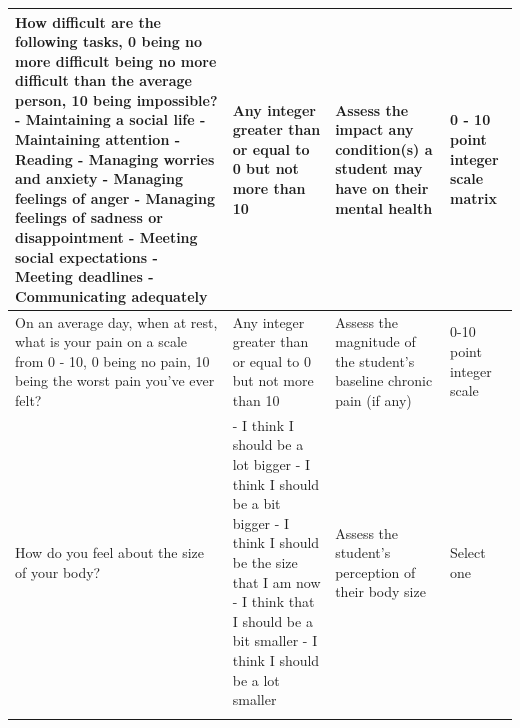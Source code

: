 \documentclass[10pt, twocolumn]{article}
\begin{document}
\begin{xltabular}{\textwidth}{|p{0.3\textwidth}|p{0.3\textwidth}|p{0.2\textwidth}|X|}
    How difficult are the following tasks, 0 being no more difficult being no more difficult than the average person, 10 being impossible? \newline - Maintaining a social life \newline - Maintaining attention \newline - Reading \newline - Managing worries and anxiety \newline - Managing feelings of anger \newline - Managing feelings of sadness or disappointment \newline - Meeting social expectations \newline - Meeting deadlines \newline - Communicating adequately & Any integer greater than or equal to 0 but not more than 10  & Assess the impact any condition(s) a student may have on their mental health & 0 - 10 point integer scale matrix \\ \hline 
    On an average day, when at rest, what is your pain on a scale from 0 - 10, 0 being no pain, 10 being the worst pain you've ever felt? & Any integer greater than or equal to 0 but not more than 10  & Assess the magnitude of the student's baseline chronic pain (if any) & 0-10 point integer scale \\ \hline 
    How do you feel about the size of your body? & - I think I should be a lot bigger \newline - I think I should be a bit bigger \newline - I think I should be the size that I am now \newline - I think that I should be a bit smaller \newline - I think I should be a lot smaller & Assess the student's perception of their body size & Select one \\
    \hline 
     \\ \hline

\end{xltabular}
\end{document}
